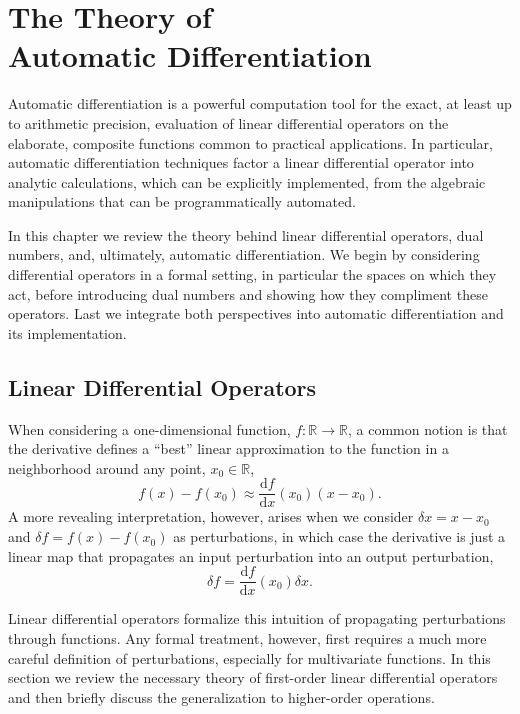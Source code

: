 \chapter{The Theory of \\ Automatic Differentiation}

Automatic differentiation is a powerful computation tool for the exact, at least up to 
arithmetic precision, evaluation of linear differential operators on the elaborate, 
composite functions common to practical applications.  In particular, automatic 
differentiation techniques factor a linear differential operator into analytic calculations, 
which can be explicitly implemented, from the algebraic manipulations that can be 
programmatically automated.

In this chapter we review the theory behind linear differential operators, dual numbers,
and, ultimately, automatic differentiation.  We begin by considering differential operators
in a formal setting, in particular the spaces on which they act, before introducing dual
numbers and showing how they compliment these operators.  Last we integrate both
perspectives into automatic differentiation and its implementation.

\section{Linear Differential Operators}

When considering a one-dimensional function, $f : \mathbb{R} \rightarrow \mathbb{R}$, 
a common notion is that the derivative defines a ``best'' linear approximation
to the function in a neighborhood around any point, $x_{0} \in \mathbb{R}$,
%
\begin{equation*}
f \! \left( x \right) - f \! \left( x_{0} \right)
\approx \frac{ \mathrm{d} f }{ \mathrm{d} x } \! \left( x_{0} \right) \left( x - x_{0} \right).
\end{equation*}
%
A more revealing interpretation, however, arises when we consider
$\delta x = x - x_{0}$ and $\delta f = f \! \left( x \right) - f \! \left( x_{0} \right)$ as
perturbations, in which case the derivative is just a linear map that propagates
an input perturbation into an output perturbation,
%
\begin{equation*}
\delta f = \frac{ \mathrm{d} f }{ \mathrm{d} x } \! \left( x_{0} \right) \delta x.
\end{equation*}

Linear differential operators formalize this intuition of propagating perturbations
through functions.  Any formal treatment, however, first requires a much more
careful definition of perturbations, especially for multivariate functions.  In this
section we review the necessary theory of first-order linear differential operators
and then briefly discuss the generalization to higher-order operations.

